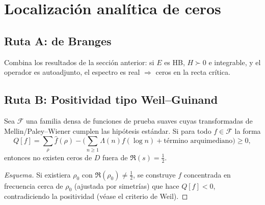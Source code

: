\section{Localización analítica de ceros}

\subsection*{Ruta A: de Branges}
Combina los resultados de la sección anterior: si $E$ es HB, $H\succ 0$ e integrable,
y el operador es autoadjunto, el espectro es real $\Rightarrow$ ceros en la recta crítica.

\subsection*{Ruta B: Positividad tipo Weil--Guinand}

\begin{theorem}
Sea $\mathcal F$ una familia densa de funciones de prueba suaves
cuyas transformadas de Mellin/Paley--Wiener cumplen las hipótesis estándar.
Si para todo $f\in\mathcal F$ la forma
\[
Q[f]=\sum_{\rho}\widehat f(\rho)-\Big(\sum_{n\ge1}\Lambda(n)f(\log n)+\text{término arquimediano}\Big)\ge 0,
\]
entonces no existen ceros de $D$ fuera de $\Re(s)=\tfrac{1}{2}$.
\end{theorem}

\begin{proof}[Esquema]
Si existiera $\rho_0$ con $\Re(\rho_0)\neq \tfrac{1}{2}$, se construye $f$
concentrada en frecuencia cerca de $\rho_0$ (ajustada por simetrías) que hace
$Q[f]<0$, contradiciendo la positividad (véase el criterio de Weil).
\end{proof}
